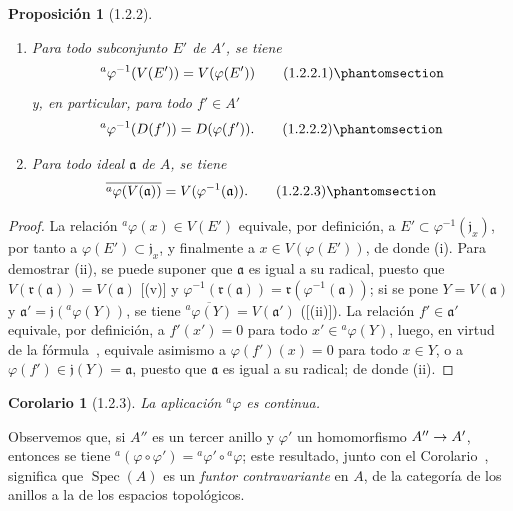 \documentclass[oneside]{amsart}
\theoremstyle{ega-env-style}
\theoremstyle{ega-thm-env-style}
\newtheorem*{proposition}{Proposición}
\newtheorem*{corollary}{Corolario}
\theoremstyle{ega-defn-env-style}
\renewcommand{\to}{\mathchoice{\longrightarrow}{\rightarrow}{\rightarrow}{\rightarrow}}
\let\EGAOriginalLabel\label
\renewcommand{\label}[1]{\phantomsection\EGAOriginalLabel{#1}}
\begin{document}
\begin{proposition}[1.2.2]
\label{I.1.2.2}
\medskip\noindent
\begin{enumerate}
  \item[{\rm(i)}] Para todo subconjunto $E'$ de $A'$, se tiene
    \begin{equation}
    {}^a\varphi^{-1}(V(E'))=V(\varphi(E'))
    \tag{1.2.2.1}\label{I.1.2.2.1-fr}
  \end{equation}
    y, en particular, para todo $f'\in A'$
    \begin{equation}
    {}^a\varphi^{-1}(D(f'))=D(\varphi(f')).
    \tag{1.2.2.2}\label{I.1.2.2.2-fr}
  \end{equation}
  \item[{\rm(ii)}] Para todo ideal $\mathfrak{a}$ de $A$, se tiene
    \begin{equation}
    \overline{{}^a\varphi(V(\mathfrak{a}))}
    =V(\varphi^{-1}(\mathfrak{a})).
    \tag{1.2.2.3}\label{I.1.2.2.3-fr}
  \end{equation}
\end{enumerate}
\end{proposition}

\begin{proof}
La relación ${}^a\varphi(x)\in V(E')$ equivale, por definición, a $E'\subset\varphi^{-1}(\mathfrak{j}_x)$, por tanto a $\varphi(E')\subset\mathfrak{j}_x$, y finalmente a $x\in V(\varphi(E'))$, de donde (i).
Para demostrar (ii), se puede suponer que $\mathfrak{a}$ es igual a su radical, puesto que $V(\mathfrak{r}(\mathfrak{a}))=V(\mathfrak{a})$ [(v)] y $\varphi^{-1}(\mathfrak{r}(\mathfrak{a}))
=\mathfrak{r}(\varphi^{-1}(\mathfrak{a}))$;
si se pone $Y=V(\mathfrak{a})$ y $\mathfrak{a}'=\mathfrak{j}({}^a\varphi(Y))$, se tiene $\overline{{}^a\varphi(Y)}=V(\mathfrak{a}')$ ([(ii)]).
La relación $f'\in\mathfrak{a}'$ equivale, por definición, a $f'(x')=0$ para todo $x'\in{}^a\varphi(Y)$, luego, en virtud de la fórmula~, equivale asimismo a $\varphi(f')(x)=0$ para todo $x\in Y$, o a $\varphi(f')\in\mathfrak{j}(Y)=\mathfrak{a}$, puesto que $\mathfrak{a}$ es igual a su radical;
de donde (ii).
\end{proof}

\begin{corollary}[1.2.3]
\label{I.1.2.3}
La aplicación ${}^a\varphi$ es continua.
\end{corollary}

Observemos que, si $A''$ es un tercer anillo y $\varphi'$ un homomorfismo $A''\to A'$, entonces se tiene ${}^a(\varphi\circ\varphi')={}^a\varphi'\circ{}^a\varphi$;
este resultado, junto con el Corolario~, significa que $\operatorname{Spec}(A)$ es un \emph{funtor contravariante} en $A$, de la categoría de los anillos a la de los espacios topológicos.
\end{document}
